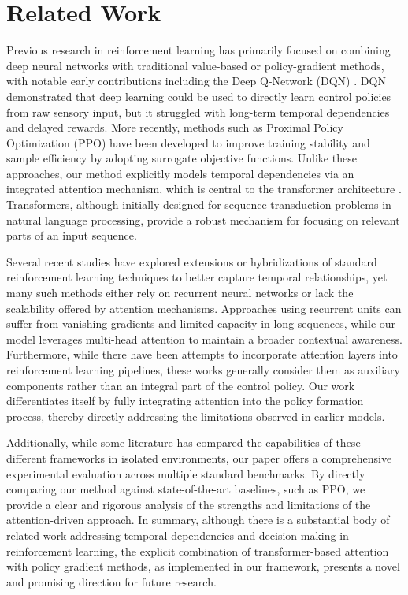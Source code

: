 \documentclass{article} %
\begin{document}
\section{Related Work}
\label{sec:related}
Previous research in reinforcement learning has primarily focused on combining deep neural networks with traditional value-based or policy-gradient methods, with notable early contributions including the Deep Q-Network (DQN) \cite{mnih_2015_dqn}. DQN demonstrated that deep learning could be used to directly learn control policies from raw sensory input, but it struggled with long-term temporal dependencies and delayed rewards. More recently, methods such as Proximal Policy Optimization (PPO) \cite{schulman_2017_ppo} have been developed to improve training stability and sample efficiency by adopting surrogate objective functions. Unlike these approaches, our method explicitly models temporal dependencies via an integrated attention mechanism, which is central to the transformer architecture \cite{ashish_2017_attention}. Transformers, although initially designed for sequence transduction problems in natural language processing, provide a robust mechanism for focusing on relevant parts of an input sequence.

Several recent studies have explored extensions or hybridizations of standard reinforcement learning techniques to better capture temporal relationships, yet many such methods either rely on recurrent neural networks or lack the scalability offered by attention mechanisms. Approaches using recurrent units can suffer from vanishing gradients and limited capacity in long sequences, while our model leverages multi-head attention to maintain a broader contextual awareness. Furthermore, while there have been attempts to incorporate attention layers into reinforcement learning pipelines, these works generally consider them as auxiliary components rather than an integral part of the control policy. Our work differentiates itself by fully integrating attention into the policy formation process, thereby directly addressing the limitations observed in earlier models.

Additionally, while some literature has compared the capabilities of these different frameworks in isolated environments, our paper offers a comprehensive experimental evaluation across multiple standard benchmarks. By directly comparing our method against state-of-the-art baselines, such as PPO, we provide a clear and rigorous analysis of the strengths and limitations of the attention-driven approach. In summary, although there is a substantial body of related work addressing temporal dependencies and decision-making in reinforcement learning, the explicit combination of transformer-based attention with policy gradient methods, as implemented in our framework, presents a novel and promising direction for future research.
\end{document}
